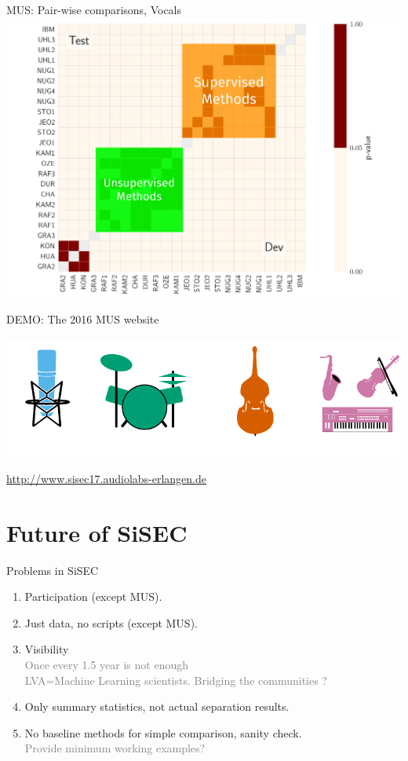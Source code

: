 \documentclass{beamer}
\begin{document}
\begin{frame}{MUS: Pair-wise comparisons, Vocals}
\includegraphics[width=\textwidth]{fig/wilcox_voc_sdr_slide_marked.pdf}
\end{frame}

\begin{frame}{DEMO: The 2016 MUS website}
\begin{center}
\includegraphics[width=\textwidth]{fig/mus-website.pdf}

\url{http://www.sisec17.audiolabs-erlangen.de}

\end{center}
\end{frame}

\section{Future of SiSEC}

\begin{frame}{Problems in SiSEC}

\begin{enumerate}
\def\labelenumi{\arabic{enumi}.}

\item
  Participation (except MUS).
\item
  Just data, no scripts (except MUS).
\item
  Visibility\\
  \textcolor{gray}{Once every 1.5 year is not enough\\LVA=Machine Learning scientists. Bridging the communities ?}
\item
  Only summary statistics, not actual separation results.
\item
  No baseline methods for simple comparison, sanity check.\\
  \textcolor{gray}{Provide minimum working examples?}
\end{enumerate}
\end{frame}
\end{document}
